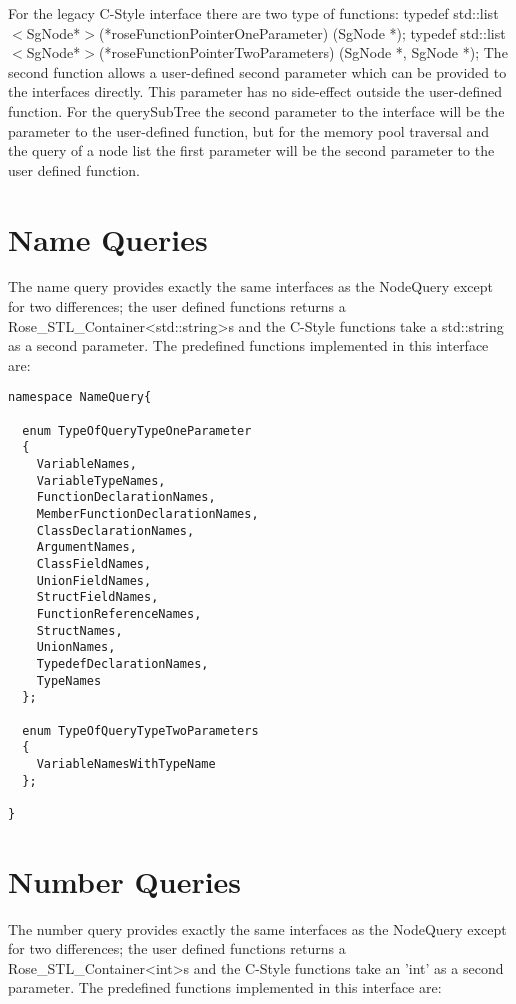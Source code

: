 For the legacy C-Style interface there are two type of functions:
  typedef std::list $<$SgNode*$>$(*roseFunctionPointerOneParameter) (SgNode *);
  typedef std::list $<$SgNode*$>$(*roseFunctionPointerTwoParameters) (SgNode *, SgNode *);
The second function allows a user-defined second parameter which  can be
provided to the interfaces directly. This parameter has no side-effect outside
the user-defined function. For the querySubTree the second parameter to the interface 
will be the parameter to the user-defined function, but for the memory pool
traversal and the query of a node list the first parameter will be the second
parameter to the user defined function.



\section{Name Queries}

The name query provides exactly the same interfaces as the NodeQuery except
for two differences; the user defined functions returns a
Rose\_STL\_Container<std::string>s and the C-Style functions take a std::string as a
second parameter. The predefined functions implemented in this interface are:

{\mySmallFontSize
\begin{verbatim}
namespace NameQuery{

  enum TypeOfQueryTypeOneParameter
  {
    VariableNames,
    VariableTypeNames,
    FunctionDeclarationNames,
    MemberFunctionDeclarationNames,
    ClassDeclarationNames,
    ArgumentNames,
    ClassFieldNames,
    UnionFieldNames,
    StructFieldNames,
    FunctionReferenceNames,
    StructNames,
    UnionNames,
    TypedefDeclarationNames,
    TypeNames
  };

  enum TypeOfQueryTypeTwoParameters
  {
    VariableNamesWithTypeName
  };

}
\end{verbatim}
}

\section{Number Queries}

The number query provides exactly the same interfaces as the NodeQuery except
for two differences; the user defined functions returns a
Rose\_STL\_Container<int>s and the C-Style functions take an 'int' as a
second parameter. The predefined functions implemented in this interface are:

